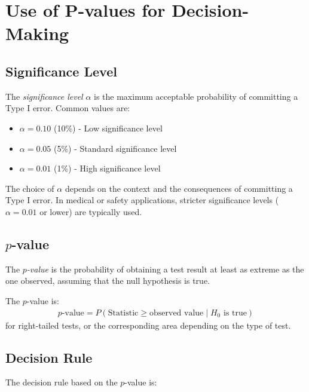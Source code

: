 \section{Use of P-values for Decision-Making}

\subsection{Significance Level}

The \emph{significance level} $\alpha$ is the maximum acceptable probability of committing a Type I error. Common values are:
\begin{itemize}
	\item $\alpha = 0.10$ (10\%) - Low significance level
	\item $\alpha = 0.05$ (5\%) - Standard significance level
	\item $\alpha = 0.01$ (1\%) - High significance level
\end{itemize}

\begin{observacion}
	The choice of $\alpha$ depends on the context and the consequences of committing a Type I error. In medical or safety applications, stricter significance levels ($\alpha = 0.01$ or lower) are typically used.
\end{observacion}

\subsection{$p$-value}

The \emph{$p$-value} is the probability of obtaining a test result at least as extreme as the one observed, assuming that the null hypothesis is true.

\begin{definicion}[$p$-value]
	The $p$-value is:
	\begin{align}
		p\text{-value} = P(\text{Statistic} \geq \text{observed value} \mid H_0 \text{ is true})
	\end{align}
	for right-tailed tests, or the corresponding area depending on the type of test.
\end{definicion}

\subsection{Decision Rule}

The decision rule based on the $p$-value is:

